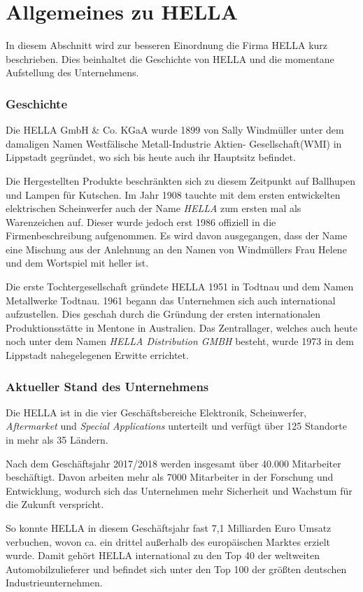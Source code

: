 \documentclass[12pt]{report}
\begin{document}
\section{Allgemeines zu HELLA}
In diesem Abschnitt wird zur besseren Einordnung die Firma HELLA kurz beschrieben. Dies beinhaltet die Geschichte von HELLA und die momentane Aufstellung des Unternehmens. \cite{he18} \cite{he19}

\subsubsection{Geschichte}
Die HELLA GmbH \& Co. KGaA wurde 1899 von Sally Windmüller unter dem damaligen Namen \glqq Westfälische Metall-Industrie Aktien- Gesellschaft(WMI)\grqq{} in Lippstadt gegründet, wo sich bis heute auch ihr Hauptsitz befindet. 

Die Hergestellten Produkte beschränkten sich zu diesem Zeitpunkt auf Ballhupen und Lampen für Kutschen. Im Jahr 1908 tauchte mit dem ersten entwickelten elektrischen Scheinwerfer auch der Name \textit{HELLA} zum ersten mal als Warenzeichen auf. Dieser wurde jedoch erst 1986 offiziell in die Firmenbeschreibung aufgenommen. Es wird davon ausgegangen, dass der Name eine Mischung aus der Anlehnung an den Namen von Windmüllers Frau Helene und dem Wortspiel mit \glqq heller\grqq{} ist. 

Die erste Tochtergesellschaft gründete HELLA 1951 in Todtnau und dem Namen \glqq Metallwerke Todtnau\grqq. 1961 begann das Unternehmen sich auch international aufzustellen. Dies geschah durch die Gründung der ersten internationalen Produktionsstätte in Mentone in Australien. 
Das Zentrallager, welches auch heute noch unter dem Namen \textit{HELLA Distribution GMBH} besteht, wurde 1973 in dem Lippstadt nahegelegenen Erwitte errichtet. 
\subsubsection[Aktueller Stand]{Aktueller Stand des Unternehmens}
Die HELLA ist in die vier Geschäftsbereiche Elektronik, Scheinwerfer, \textit{Aftermarket} und \textit{Special Applications} unterteilt und verfügt über 125 Standorte in mehr als 35 Ländern.

Nach dem Geschäftsjahr 2017/2018 werden insgesamt über 40.000 Mitarbeiter beschäftigt. Davon arbeiten mehr als 7000 Mitarbeiter in der Forschung und Entwicklung, wodurch sich das Unternehmen mehr Sicherheit und Wachstum für die Zukunft verspricht. 

So konnte HELLA in diesem Geschäftsjahr fast 7,1 Milliarden Euro Umsatz verbuchen, wovon ca. ein drittel außerhalb des europäischen Marktes erzielt wurde. Damit gehört HELLA international zu den Top 40 der weltweiten Automobilzulieferer und befindet sich unter den Top 100 der größten deutschen Industrieunternehmen. 
\end{document}
